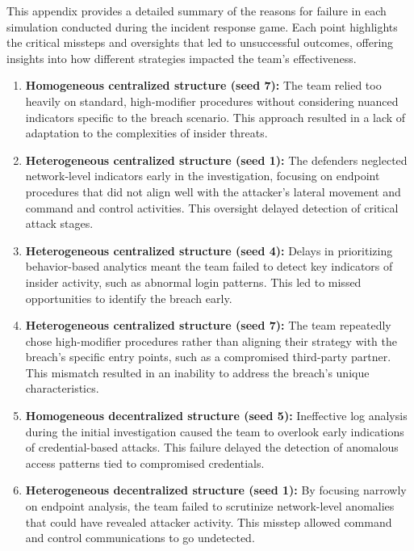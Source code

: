 \documentclass[letterpaper]{article} %
\begin{document}
This appendix provides a detailed summary of the reasons for failure in each simulation conducted during the incident response game. Each point highlights the critical missteps and oversights that led to unsuccessful outcomes, offering insights into how different strategies impacted the team's effectiveness.

\begin{enumerate}
    \item \textbf{Homogeneous centralized structure (seed 7):} The team relied too heavily on standard, high-modifier procedures without considering nuanced indicators specific to the breach scenario. This approach resulted in a lack of adaptation to the complexities of insider threats.

    \item \textbf{Heterogeneous centralized structure (seed 1):} The defenders neglected network-level indicators early in the investigation, focusing on endpoint procedures that did not align well with the attacker’s lateral movement and command and control activities. This oversight delayed detection of critical attack stages.

    \item \textbf{Heterogeneous centralized structure (seed 4):} Delays in prioritizing behavior-based analytics meant the team failed to detect key indicators of insider activity, such as abnormal login patterns. This led to missed opportunities to identify the breach early.

    \item \textbf{Heterogeneous centralized structure (seed 7):} The team repeatedly chose high-modifier procedures rather than aligning their strategy with the breach’s specific entry points, such as a compromised third-party partner. This mismatch resulted in an inability to address the breach’s unique characteristics.

    \item \textbf{Homogeneous decentralized structure (seed 5):} Ineffective log analysis during the initial investigation caused the team to overlook early indications of credential-based attacks. This failure delayed the detection of anomalous access patterns tied to compromised credentials.

    \item \textbf{Heterogeneous decentralized structure (seed 1):} By focusing narrowly on endpoint analysis, the team failed to scrutinize network-level anomalies that could have revealed attacker activity. This misstep allowed command and control communications to go undetected.


\end{enumerate}
\end{document}
